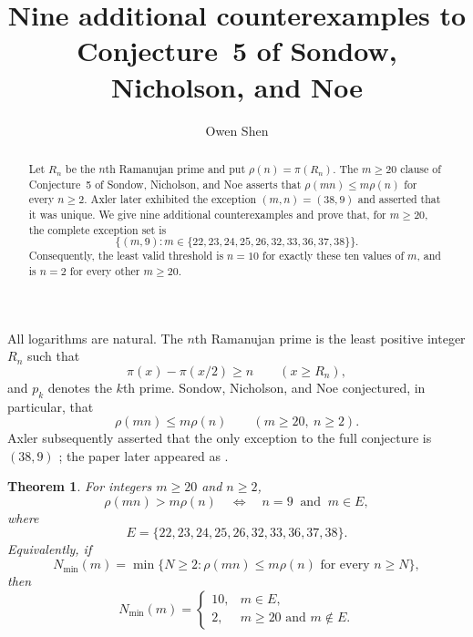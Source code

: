 \documentclass[11pt]{amsart}
\title[Additional Ramanujan-prime exceptions]
{Nine additional counterexamples to Conjecture~5 of Sondow, Nicholson, and Noe}
\author{Owen Shen}
\date{}
\newtheorem{theorem}{Theorem}
\begin{document}
\begin{abstract}
Let $R_n$ be the $n$th Ramanujan prime and put
$\rho(n)=\pi(R_n)$.  The $m\geq20$ clause of Conjecture~5 of
Sondow, Nicholson, and Noe asserts that
$\rho(mn)\leq m\rho(n)$ for every $n\geq2$.
Axler later exhibited the exception $(m,n)=(38,9)$ and asserted that it
was unique.  We give nine additional counterexamples and prove that, for
$m\geq20$, the complete exception set is
\[
 \{(m,9):m\in\{22,23,24,25,26,32,33,36,37,38\}\}.
\]
Consequently, the least valid threshold is $n=10$ for exactly these ten
values of $m$, and is $n=2$ for every other $m\geq20$.
\end{abstract}

\maketitle

All logarithms are natural.  The $n$th Ramanujan prime is the least
positive integer $R_n$ such that
\[
 \pi(x)-\pi(x/2)\geq n \qquad (x\geq R_n),
\]
and $p_k$ denotes the $k$th prime.  Sondow, Nicholson, and Noe
\cite[Conjecture~5]{SNN} conjectured, in particular, that
\begin{equation}\label{eq:conjecture}
 \rho(mn)\leq m\rho(n) \qquad (m\geq20,\ n\geq2).
\end{equation}
Axler subsequently asserted that the only exception to the full
conjecture is $(38,9)$ \cite[Theorem~1.7]{Axler17}; the paper later
appeared as \cite{Axler20}.

\begin{theorem}\label{thm:main}
For integers $m\geq20$ and $n\geq2$,
\[
 \rho(mn)>m\rho(n)
 \quad\Longleftrightarrow\quad
 n=9\ \text{ and }\
 m\in E,
\]
where
\[
 E=\{22,23,24,25,26,32,33,36,37,38\}.
\]
Equivalently, if
\[
 N_{\min}(m)=\min\{N\geq2:\rho(mn)\leq m\rho(n)
                         \text{ for every }n\geq N\},
\]
then
\[
 N_{\min}(m)=
 \begin{cases}
  10,&m\in E,\\
  2,&m\geq20\text{ and }m\notin E.
 \end{cases}
\]
\end{theorem}
\end{document}
